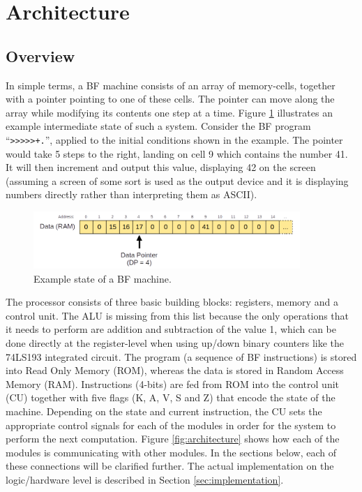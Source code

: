 \section{Architecture} \label{sec:architecture}
\subsection{Overview} \label{sec:architecture:overview}
In simple terms, a BF machine consists of an array of memory-cells, together with a pointer pointing to one of these cells. The pointer can move along the array while modifying its contents one step at a time. Figure \ref{fig:simplerepresentation} illustrates an example intermediate state of such a system. Consider the BF program ``\texttt{>>>>>+.}'', applied to the initial conditions shown in the example. The pointer would take 5 steps to the right, landing on cell 9 which contains the number 41. It will then increment and output this value, displaying 42 on the screen (assuming a screen of some sort is used as the output device and it is displaying numbers directly rather than interpreting them as ASCII).

\begin{figure}[H]
  \centering
  \includegraphics[width=0.9\textwidth]{img/simple_representation}
  \caption{Example state of a BF machine.}
  \label{fig:simplerepresentation}
\end{figure}


The processor consists of three basic building blocks: registers, memory and a control unit. The ALU is missing from this list because the only operations that it needs to perform are addition and subtraction of the value 1, which can be done directly at the register-level when using up/down binary counters like the 74LS193 integrated circuit. The program (a sequence of BF instructions) is stored into Read Only Memory (ROM), whereas the data is stored in Random Access Memory (RAM). Instructions (4-bits) are fed from ROM into the control unit (CU) together with five flags (K, A, V, S and Z) that encode the state of the machine. Depending on the state and current instruction, the CU sets the appropriate control signals for each of the modules in order for the system to perform the next computation. Figure \ref{fig:architecture} shows how each of the modules is communicating with other modules. In the sections below, each of these connections will be clarified further. The actual implementation on the logic/hardware level is described in Section \ref{sec:implementation}.

